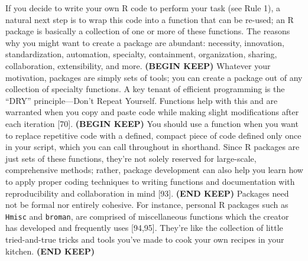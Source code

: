 \documentclass[10pt,letterpaper]{article}
\begin{document}
If you decide to write your own R code to perform your task (see Rule
1), a natural next step is to wrap this code into a function that can be
re-used; an R package is basically a collection of one or more of these
functions. The reasons why you might want to create a package are
abundant: necessity, innovation, standardization, automation, specialty,
containment, organization, sharing, collaboration, extensibility, and
more. \textbf{(BEGIN KEEP)} Whatever your motivation, packages are
simply sets of tools; you can create a package out of any collection of
specialty functions. A key tenant of efficient programming is the
``DRY'' principle---Don't Repeat Yourself. Functions help with this and
are warranted when you copy and paste code while making slight
modifications after each iteration {[}70{]}. \textbf{(BEGIN KEEP)} You
should use a function when you want to replace repetitive code with a
defined, compact piece of code defined only once in your script, which
you can call throughout in shorthand. Since R packages are just sets of
these functions, they're not solely reserved for large-scale,
comprehensive methods; rather, package development can also help you
learn how to apply proper coding techniques to writing functions and
documentation with reproducibility and collaboration in mind {[}93{]}.
\textbf{(END KEEP)} Packages need not be formal nor entirely cohesive.
For instance, personal R packages such as \texttt{Hmisc} and
\texttt{broman}, are comprised of miscellaneous functions which the
creator has developed and frequently uses {[}94,95{]}. They're like the
collection of little tried-and-true tricks and tools you've made to cook
your own recipes in your kitchen. \textbf{(END KEEP)}
\end{document}
